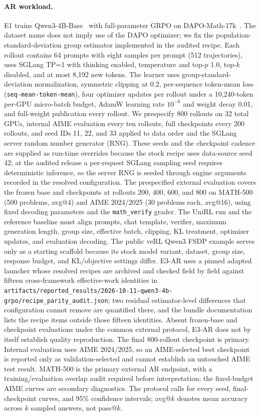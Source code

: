 \documentclass[10pt]{article}
\newcommand{\codepath}[1]{\texttt{#1}}
\begin{document}
\paragraph{AR workload.}
E1 trains Qwen3-4B-Base~\citep{yang2025qwen3} with full-parameter GRPO on DAPO-Math-17k~\citep{yu2025dapo}.
The dataset name does not imply use of the DAPO optimizer; we fix the population-standard-deviation group estimator implemented in the audited recipe.
Each rollout contains 64 prompts with eight samples per prompt (512 trajectories), uses SGLang TP=1 with thinking enabled, temperature and top-$p$ 1.0, top-$k$ disabled, and at most 8,192 new tokens.
The learner uses group-standard-deviation normalization, symmetric clipping at 0.2, per-sequence token-mean loss (\texttt{seq-mean-token-mean}), four optimizer updates per rollout under a 10,240-token per-GPU micro-batch budget, AdamW learning rate $10^{-6}$ and weight decay 0.01, and full-weight publication every rollout.
We prespecify 800 rollouts on 32 total GPUs, internal AIME evaluation every ten rollouts, full checkpoints every 200 rollouts, and seed IDs 11, 22, and 33 applied to data order and the SGLang server random number generator (RNG).
These seeds and the checkpoint cadence are supplied as run-time overrides because the stock recipe uses data-source seed 42; at the audited release a per-request SGLang sampling seed requires deterministic inference, so the server RNG is seeded through engine arguments recorded in the resolved configuration.
The prespecified external evaluation covers the frozen base and checkpoints at rollouts 200, 400, 600, and 800 on MATH-500 (500 problems, avg@4) and AIME 2024/2025 (30 problems each, avg@16), using fixed decoding parameters and the \texttt{math\_verify} grader.
The UniRL run and the reference baseline must align prompts, chat template, verifier, maximum generation length, group size, effective batch, clipping, KL treatment, optimizer updates, and evaluation decoding.
The public veRL Qwen3 FSDP example serves only as a starting scaffold because its stock model variant, dataset, group size, response budget, and KL/objective settings differ.
E3-AR uses a pinned adapted launcher whose resolved recipes are archived and checked field by field against fifteen cross-framework effective-work identities in \codepath{artifacts/reported\_results/2026-10-11-qwen3-4b-grpo/recipe\_parity\_audit.json}; two residual estimator-level differences that configuration cannot remove are quantified there, and the bundle documentation lists the recipe items outside those fifteen identities. Absent frozen-base and checkpoint evaluations under the common external protocol, E3-AR does not by itself establish quality reproduction.
The final 800-rollout checkpoint is primary. Internal evaluation uses AIME 2024/2025, so an AIME-selected best checkpoint is reported only as validation-selected and cannot establish an untouched AIME test result.
MATH-500 is the primary external AR endpoint, with a training/evaluation overlap audit required before interpretation; the fixed-budget AIME curves are secondary diagnostics.
The protocol calls for every seed, final-checkpoint curves, and 95\% confidence intervals; avg@$k$ denotes mean accuracy across $k$ sampled answers, not pass@$k$.
\end{document}
